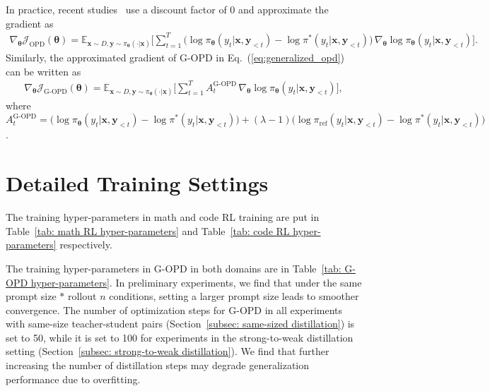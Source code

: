 \documentclass{article} %
\begin{document}
In practice, recent studies~\citep{opd-tml,mimo} use a discount factor of 0 and approximate the gradient as
\begin{equation}
\begin{aligned}
\nabla_{\boldsymbol{\theta}} \mathcal{J}_{\text{OPD}}(\boldsymbol{\theta}) = 
\mathbb{E}_{\boldsymbol{x} \sim D, \boldsymbol{y} \sim \pi_{\boldsymbol{\theta}} (\cdot | \boldsymbol{x}) }\Big[
\sum_{t=1}^{T} \big(\log \pi_{\boldsymbol{\theta}}(y_t| \boldsymbol{x}, \boldsymbol{y}_{<t} ) - \log \pi^{*}(y_t| \boldsymbol{x}, \boldsymbol{y}_{<t} ) \big) \, \nabla_{\boldsymbol{\theta}} \log \pi_{\boldsymbol{\theta}}(y_t| \boldsymbol{x}, \boldsymbol{y}_{<t} ) 
\Big].
\end{aligned}
\end{equation}
Similarly, the approximated gradient of G-OPD in Eq.~(\ref{eq:generalized_opd}) can be written as
\begin{equation}
\begin{aligned}
\nabla_{\boldsymbol{\theta}} \mathcal{J}_{\text{G-OPD}}(\boldsymbol{\theta}) = 
\mathbb{E}_{\boldsymbol{x} \sim D, \boldsymbol{y} \sim \pi_{\boldsymbol{\theta}} (\cdot | \boldsymbol{x}) }\Big[
\sum_{t=1}^{T} A_{t}^{\text{G-OPD}} \, \nabla_{\boldsymbol{\theta}} \log \pi_{\boldsymbol{\theta}}(y_t| \boldsymbol{x}, \boldsymbol{y}_{<t} ) 
\Big],
\end{aligned}
\end{equation}
where $A_{t}^{\text{G-OPD}} = \big(\log \pi_{\boldsymbol{\theta}}(y_t| \boldsymbol{x}, \boldsymbol{y}_{<t} ) - \log \pi^{*}(y_t| \boldsymbol{x}, \boldsymbol{y}_{<t} ) \big) + (\lambda - 1)\big(\log \pi_{\text{ref}}(y_t| \boldsymbol{x}, \boldsymbol{y}_{<t} ) - \log \pi^{*}(y_t| \boldsymbol{x}, \boldsymbol{y}_{<t} ) \big)$.

\section{Detailed Training Settings}
\label{appendix: training settings}

The training hyper-parameters in math and code RL training are put in Table~\ref{tab: math RL hyper-parameters} and Table~\ref{tab: code RL hyper-parameters}  respectively. 

The training hyper-parameters in G-OPD in both domains are in Table~\ref{tab: G-OPD hyper-parameters}. In preliminary experiments, we find that under the same prompt size $*$ rollout $n$ conditions, setting a larger prompt size leads to smoother convergence. The number of optimization steps for G-OPD in all experiments with same-size teacher-student pairs (Section~\ref{subsec: same-sized distillation}) is set to 50, while it is set to 100 for experiments in the strong-to-weak distillation setting (Section~\ref{subsec: strong-to-weak distillation}). We find that further increasing the number of distillation steps may degrade generalization performance due to overfitting.
\end{document}

